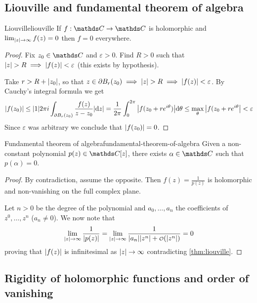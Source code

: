 \documentclass[12pt]{extarticle}
\numberwithin{equation}{subsection}
\begin{document}
\subsection{Liouville and fundamental theorem of algebra}

\begin{theorem}{Liouville}{liouville}
	If $f: \C \to \C$ is holomorphic and $\lim_{\abs{z} \to \infty} f(z) = 0$ then $f = 0$ everywhere.
\end{theorem}

\begin{proof}
	Fix $z_0 \in \C$ and $\varepsilon > 0$. Find $R > 0$ such that
	$\abs{z} > R \implies \abs{f(z)} < \varepsilon$ (this exists by hypothesis).

	Take $r > R + \abs{z_0}$, so that
	$z \in \partial B_r(z_0) \implies \abs{z} > R \implies \abs{f(z)} < \varepsilon$.
	By Cauchy's integral formula we get
	\begin{equation}
		\abs{f(z_0)} \leq \abs{1}{2 \pi i} \int_{\partial B_r(z_0)} \frac{f(z)}{z - z_0} \abs{\dd z}
		= \frac{1}{2\pi} \int_0^{2\pi} \abs{f(z_0 + r e^{i\theta})} \dd \theta
		\leq \max_\theta \abs{f(z_0 + r e^{i\theta}} < \varepsilon
	\end{equation}
	Since $\varepsilon$ was arbitrary we conclude that $\abs{f(z_0)} = 0$.
\end{proof}

\begin{corollary}{Fundamental theorem of algebra}{fundamental-theorem-of-algebra}
	Given a non-constant polynomial $p(z) \in \C[z]$, there exists $\alpha \in \C$ such that
	$p(\alpha) = 0$.
\end{corollary}

\begin{proof}
	By contradiction, assume the opposite.
	Then $f(z) = \frac{1}{p(z)}$ is holomorphic and non-vanishing on the full complex plane.

	Let $n > 0$ be the degree of the polynomial and $a_0, \dots, a_n$ the coefficients of
	$z^0, \dots, z^n$ ($a_n \neq 0$).
	We now note that
	\begin{equation}
		\lim_{\abs{z} \to \infty} \frac{1}{\abs{p(z)}} = \lim_{\abs{z} \to \infty}
		\frac{1}{\abs{a_n}\abs{z^n} + \o(\abs{z^n})} = 0
	\end{equation}
	proving that $\abs{f(z)}$ is infinitesimal as $\abs{z} \to \infty$ contradicting
	\cref{thm:liouville}.
\end{proof}

\subsection{Rigidity of holomorphic functions and order of vanishing}
\end{document}
